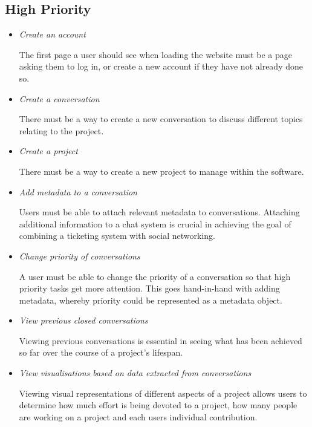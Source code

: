 \documentclass[a4paper]{l3proj}
\begin{document}
\subsection{High Priority}
\begin{itemize}
\item \textit{Create an account} \par
The first page a user should see when loading the website must be a page asking them to log in, or create a new account if they have not already done so.
\item \textit{Create a conversation} \par
There must be a way to create a new conversation to discuss different topics relating to the project.
\item \textit{Create a project} \par
There must be a way to create a new project to manage within the software. 
\item \textit{Add metadata to a conversation} \par
Users must be able to attach relevant metadata to conversations.  Attaching additional information to a chat system is crucial in achieving the goal of combining a ticketing system with social networking.
\item \textit{Change priority of conversations} \par
A user must be able to change the priority of a conversation so that high priority tasks get more attention.  This goes hand-in-hand with adding metadata, whereby priority could be represented as a metadata object.
\item \textit{View previous closed conversations} \par
Viewing previous conversations is essential in seeing what has been achieved so far over the course of a project's lifespan.
\item \textit{View visualisations based on data extracted from conversations} \par
Viewing visual representations of different aspects of a project allows users to determine how much effort is being devoted to a project, how many people are working on a project and each users individual contribution.
\end{itemize}
\end{document}
